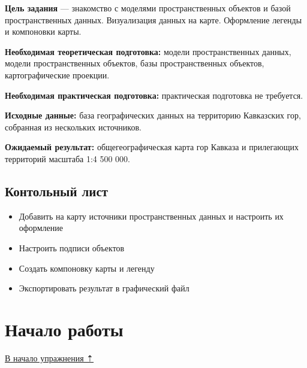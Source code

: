 \documentclass[
  12pt,
]{book}
\providecommand{\tightlist}{%
  \setlength{\itemsep}{0pt}\setlength{\parskip}{0pt}}
\begin{document}
\textbf{Цель задания} --- знакомство с моделями пространственных объектов и базой пространственных данных. Визуализация данных на карте. Оформление легенды и компоновки карты.

\textbf{Необходимая теоретическая подготовка:} модели пространственных данных, модели пространственных объектов, базы пространственных объектов, картографические проекции.

\textbf{Необходимая практическая подготовка:} практическая подготовка не требуется.

\textbf{Исходные данные:} база географических данных на территорию Кавказских гор, собранная из нескольких источников.

\textbf{Ожидаемый результат:} общегеографическая карта гор Кавказа и прилегающих территорий масштаба 1:4 500 000.

\hypertarget{map-design-general-checklist}{%
\subsection{Контольный лист}\label{map-design-general-checklist}}

\begin{itemize}
\tightlist
\item
  Добавить на карту источники пространственных данных и настроить их оформление
\item
  Настроить подписи объектов
\item
  Создать компоновку карты и легенду
\item
  Экспортировать результат в графический файл
\end{itemize}

\hypertarget{map-design-general-begin}{%
\section{Начало работы}\label{map-design-general-begin}}

\protect\hyperlink{map-design-general}{В начало упражнения ⇡}
\end{document}
